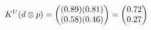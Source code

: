 \documentclass[preview]{standalone}
\begin{document}
\begin{align*}
\special{dvisvgm:raw <g id='unique000'>}K^U(d \otimes p) = \begin{pmatrix} (0.89)(0.81) \\ (0.58)(0.46) \end{pmatrix} = \begin{pmatrix} 0.72 \\ 0.27 \end{pmatrix}\special{dvisvgm:raw </g>}
\end{align*}
\end{document}
